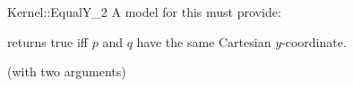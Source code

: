 \begin{ccRefFunctionObjectConcept}{Kernel::EqualY_2}
A model for this must provide:


{returns true iff $p$ and $q$ have the same Cartesian $y$-coordinate.}

\ccRefines
{} (with two arguments)

\ccSeeAlso
{}\\

\end{ccRefFunctionObjectConcept}
